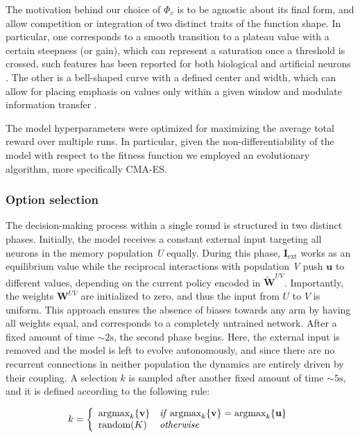 The motivation behind our choice of $\Phi_{v}$ is to be agnostic about its final form, and allow competition or integration of two distinct traits of the function shape.
In particular, one corresponds to a smooth transition to a plateau value with a certain steepness (or gain), which can represent a saturation once a threshold is crossed, such features has been reported for both biological and artificial neurons \cite{ockerFlexibleNeuralConnectivity2020, apicellaSurveyModernTrainable2021}.
The other is a bell-shaped curve with a defined center and width, which can allow for placing emphasis on values only within a given window and modulate information transfer \cite{millerCombinedMechanismsNeural2019}.

The model hyperparameters were optimized for maximizing the average total reward over multiple runs. In particular, given the non-differentiability of the model with respect to the fitness function we employed an evolutionary algorithm, more specifically CMA-ES.

\subsubsection{Option selection}
The decision-making process within a single round is structured in two distinct phases. Initially, the model receives a constant external input targeting all neurons in the memory population \textit{U} equally.
During this phase, $\textbf{I}_{\text{ext}}$ works as an equilibrium value while the reciprocal interactions with population \textit{V} push $\textbf{u}$ to different values, depending on the current policy encoded in $\widetilde{\textbf{W}}^{UV}$.
Importantly, the weights $\textbf{W}^{UV}$ are initialized to zero, and thus the input from $U$ to $V$ is uniform. This approach ensures the absence of biases towards any arm by having all weights equal, and corresponds to a completely untrained network.
After a fixed amount of time $\sim 2 \text{s}$, the second phase begins. Here, the external input is removed and the model is left to evolve autonomously, and since there are no recurrent connections in neither population the dynamics are entirely driven by their coupling.
A selection $k$ is sampled after another fixed amount of time $\sim 5 \text{s}$, and it is defined according to the following rule:

\begin{equation*}
    k =
    \left\{
        \begin{array}{ll}
            \text{argmax}_{k}\{\textbf{v}\} & \text{\textit{if}}\; \text{argmax}_{k} \{\textbf{v}\} = \text{argmax}_{k} \{\textbf{u}\} \\
            \text{random}(K) & \text{\textit{otherwise}}
        \end{array}
    \right.
\end{equation*}

